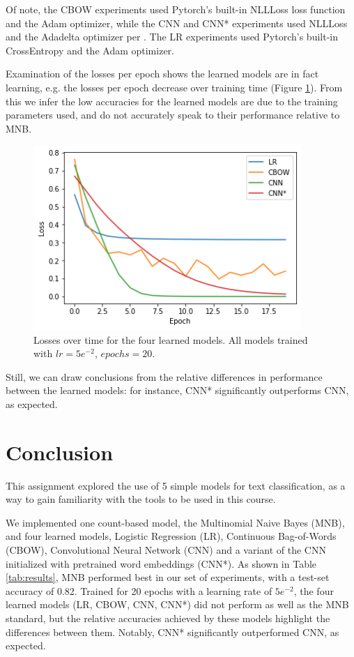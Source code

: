\documentclass[11pt]{article}
\begin{document}

Of note, the CBOW experiments used Pytorch's built-in NLLLoss loss function and the Adam optimizer, while the CNN and CNN* experiments used NLLLoss and the Adadelta optimizer per \cite{kim2014convolutional}. The LR experiments used Pytorch's built-in CrossEntropy and the Adam optimizer.

Examination of the losses per epoch shows the learned models are in fact learning, e.g. the losses per epoch decrease over training time (Figure \ref{fig:losses}). From this we infer the low accuracies for the learned models are due to the training parameters used, and do not accurately speak to their performance relative to MNB.

\begin{figure}[h]
  \centering
  \includegraphics[width=4in]{losses.png}
  \caption{\label{fig:losses} Losses over time for the four learned models. All models trained with $lr=5e^{-2}$, $epochs=20$.}
\end{figure}

Still, we can draw conclusions from the relative differences in performance between the learned models: for instance, CNN* significantly outperforms CNN, as expected.

\section{Conclusion}

This assignment explored the use of 5 simple models for text classification, as a way to gain familiarity with the tools to be used in this course. 

We implemented one count-based model, the Multinomial Naive Bayes (MNB), and four learned models, Logistic Regression (LR), Continuous Bag-of-Words (CBOW), Convolutional Neural Network (CNN) and a variant of the CNN initialized with pretrained word embeddings (CNN*). As shown in Table \ref{tab:results}, MNB performed best in our set of experiments, with a test-set accuracy of 0.82. Trained for 20 epochs with a learning rate of $5e^{-2}$, the four learned models (LR, CBOW, CNN, CNN*) did not perform as well as the MNB standard, but the relative accuracies achieved by these models highlight the differences between them. Notably, CNN* significantly outperformed CNN, as expected.
\end{document}
